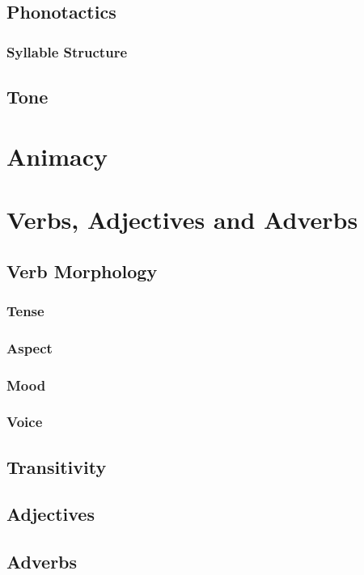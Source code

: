\documentclass[11pt,a4paper,titlepage]{article}
\begin{document}
		\subsection{Phonotactics}
			\subsubsection{Syllable Structure}

		\subsection{Tone}
			\lipsum[1]
	\section{Animacy}
		\lipsum[1]
	\section{Verbs, Adjectives and Adverbs}
		\lipsum[1]
		\subsection{Verb Morphology}
			\lipsum[1]
			\subsubsection{Tense}
				\lipsum[1]
			\subsubsection{Aspect}
				\lipsum[1]
			\subsubsection{Mood}
				\lipsum[1]
			\subsubsection{Voice}
				\lipsum[1]
		\subsection{Transitivity}
			\lipsum[1]
		\subsection{Adjectives}
			\lipsum[1]
		\subsection{Adverbs}
			\lipsum[1]
\end{document}
